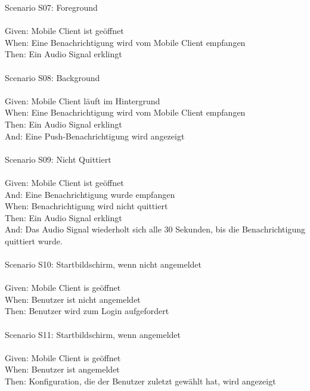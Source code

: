 \begin{tabbing}
    Scenario S07: \> \> \>  Foreground\\ \\
    Given: \> \> \>   Mobile Client ist geöffnet\\
    When: \> \> \>    Eine Benachrichtigung wird vom Mobile Client empfangen\\
    Then: \> \> \>    Ein Audio Signal erklingt\\
    \\
    Scenario S08: \> \> \>  Background\\ \\
    Given: \> \> \>   Mobile Client läuft im Hintergrund\\
    When: \> \> \>    Eine Benachrichtigung wird vom Mobile Client empfangen\\
    Then: \> \> \>    Ein Audio Signal erklingt\\
    And: \> \> \>     Eine Push-Benachrichtigung wird angezeigt\\
    \\
    Scenario S09: \> \> \>  Nicht Quittiert\\ \\
    Given: \> \> \>   Mobile Client ist geöffnet\\
    And: \> \> \>     Eine Benachrichtigung wurde empfangen\\
    When: \> \> \>    Benachrichtigung wird nicht quittiert\\
    Then: \> \> \>    Ein Audio Signal erklingt\\
    And: \> \> \>     Das Audio Signal wiederholt sich alle 30 Sekunden, bis die Benachrichtigung quittiert wurde.\\
    \\
    Scenario S10: \> \> \>  Startbildschirm, wenn nicht angemeldet\\ \\
    Given: \> \> \>   Mobile Client is geöffnet\\
    When: \> \> \>  Benutzer ist nicht angemeldet\\
    Then: \> \> \>  Benutzer wird zum Login aufgefordert\\
    \\
    Scenario S11: \> \> \>  Startbildschirm, wenn angemeldet\\ \\
    Given: \> \> \>   Mobile Client is geöffnet\\
    When: \> \> \>  Benutzer ist angemeldet\\
    Then: \> \> \>  Konfiguration, die der Benutzer zuletzt gewählt hat, wird angezeigt\\

\end{tabbing}
